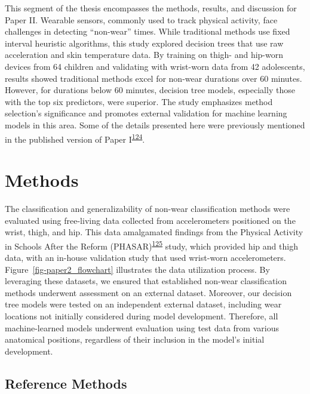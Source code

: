 \documentclass[
  10pt,
]{scrbook}
\begin{document}
This segment of the thesis encompasses the methods, results, and
discussion for Paper II. Wearable sensors, commonly used to track
physical activity, face challenges in detecting ``non-wear'' times.
While traditional methods use fixed interval heuristic algorithms, this
study explored decision trees that use raw acceleration and skin
temperature data. By training on thigh- and hip-worn devices from 64
children and validating with wrist-worn data from 42 adolescents,
results showed traditional methods excel for non-wear durations over 60
minutes. However, for durations below 60 minutes, decision tree models,
especially those with the top six predictors, were superior. The study
emphasizes method selection's significance and promotes external
validation for machine learning models in this area. Some of the details
presented here were previously mentioned in the published version of
Paper
I\textsuperscript{\protect\hyperlink{ref-skovgaard_generalizability_2023}{124}}.

\hypertarget{methods-1}{%
\section{Methods}\label{methods-1}}

The classification and generalizability of non-wear classification
methods were evaluated using free-living data collected from
accelerometers positioned on the wrist, thigh, and hip. This data
amalgamated findings from the Physical Activity in Schools After the
Reform
(PHASAR)\textsuperscript{\protect\hyperlink{ref-pedersen_protocol_2018}{125}}
study, which provided hip and thigh data, with an in-house validation
study that used wrist-worn accelerometers.
Figure~\ref{fig-paper2_flowchart} illustrates the data utilization
process. By leveraging these datasets, we ensured that established
non-wear classification methods underwent assessment on an external
dataset. Moreover, our decision tree models were tested on an
independent external dataset, including wear locations not initially
considered during model development. Therefore, all machine-learned
models underwent evaluation using test data from various anatomical
positions, regardless of their inclusion in the model's initial
development.

\hypertarget{reference-methods}{%
\subsection{Reference Methods}\label{reference-methods}}
\end{document}
